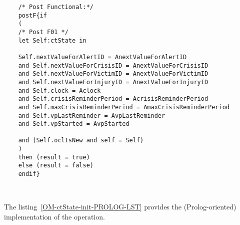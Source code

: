 	\scriptsize
	\vspace{0.5cm}
	\begin{lstlisting}[style=MessirStyle,firstnumber=auto,captionpos=b,caption={\msrmessir (MCL-oriented) specification of the operation \emph{init}.},label=OM-ctState-init-MCL-LST]

	
	
	/* Post Functional:*/ 
	postF{if
	(
	/* Post F01 */
	let Self:ctState in
	
	Self.nextValueForAlertID = AnextValueForAlertID
	and Self.nextValueForCrisisID = AnextValueForCrisisID
	and Self.nextValueForVictimID = AnextValueForVictimID
	and Self.nextValueForInjuryID = AnextValueForInjuryID
	and Self.clock = Aclock
	and Self.crisisReminderPeriod = AcrisisReminderPeriod
	and Self.maxCrisisReminderPeriod = AmaxCrisisReminderPeriod
	and Self.vpLastReminder = AvpLastReminder
	and Self.vpStarted = AvpStarted
	
	and (Self.oclIsNew and self = Self)
	)
	then (result = true)
	else (result = false)
	endif}
	
	
	\end{lstlisting}
	\normalsize 
	
	
	
	
	
	\vspace{1cm}
	The listing~\ref{OM-ctState-init-PROLOG-LST} provides the \msrmessir (Prolog-oriented) implementation of the operation.
	
	\scriptsize
	\vspace{0.5cm}
	
	
	\normalsize





